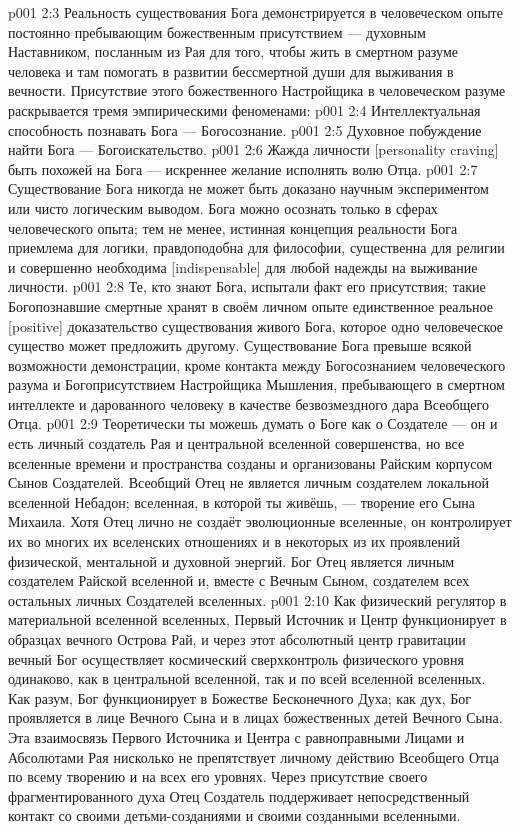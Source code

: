\vs p001 2:3 \pc Реальность существования Бога демонстрируется в человеческом опыте постоянно пребывающим божественным присутствием --- духовным Наставником, посланным из Рая для того, чтобы жить в смертном разуме человека и там помогать в развитии бессмертной души для выживания в вечности. Присутствие этого божественного Настройщика в человеческом разуме раскрывается тремя эмпирическими феноменами:
\vs p001 2:4 \bibnobreakspace Интеллектуальная способность познавать Бога --- Богосознание.
\vs p001 2:5 \bibnobreakspace Духовное побуждение найти Бога --- Богоискательство.
\vs p001 2:6 \bibnobreakspace Жажда личности [personality craving] быть похожей на Бога --- искреннее желание исполнять волю Отца.
\vs p001 2:7 \pc Существование Бога никогда не может быть доказано научным экспериментом или чисто логическим выводом. Бога можно осознать только в сферах человеческого опыта; тем не менее, истинная концепция реальности Бога приемлема для логики, правдоподобна для философии, существенна для религии и совершенно необходима [indispensable] для любой надежды на выживание личности.
\vs p001 2:8 Те, кто знают Бога, испытали факт его присутствия; такие Богопознавшие смертные хранят в своём личном опыте единственное реальное [positive] доказательство существования живого Бога, которое одно человеческое существо может предложить другому. Существование Бога превыше всякой возможности демонстрации, кроме контакта между Богосознанием человеческого разума и Богоприсутствием Настройщика Мышления, пребывающего в смертном интеллекте и дарованного человеку в качестве безвозмездного дара Всеобщего Отца.
\vs p001 2:9 \pc Теоретически ты можешь думать о Боге как о Создателе --- он и есть личный создатель Рая и центральной вселенной совершенства, но все вселенные времени и пространства созданы и организованы Райским корпусом Сынов Создателей. Всеобщий Отец не является личным создателем локальной вселенной Небадон; вселенная, в которой ты живёшь, --- творение его Сына Михаила. Хотя Отец лично не создаёт эволюционные вселенные, он контролирует их во многих их вселенских отношениях и в некоторых из их проявлений физической, ментальной и духовной энергий. Бог Отец является личным создателем Райской вселенной и, вместе с Вечным Сыном, создателем всех остальных личных Создателей вселенных.
\vs p001 2:10 \pc Как физический регулятор в материальной вселенной вселенных, Первый Источник и Центр функционирует в образцах вечного Острова Рай, и через этот абсолютный центр гравитации вечный Бог осуществляет космический сверхконтроль физического уровня одинаково, как в центральной вселенной, так и по всей вселенной вселенных. Как разум, Бог функционирует в Божестве Бесконечного Духа; как дух, Бог проявляется в лице Вечного Сына и в лицах божественных детей Вечного Сына. Эта взаимосвязь Первого Источника и Центра с равноправными Лицами и Абсолютами Рая нисколько не препятствует  личному действию Всеобщего Отца по всему творению и на всех его уровнях. Через присутствие своего фрагментированного духа Отец Создатель поддерживает непосредственный контакт со своими детьми\hyp{}созданиями и своими созданными вселенными.
